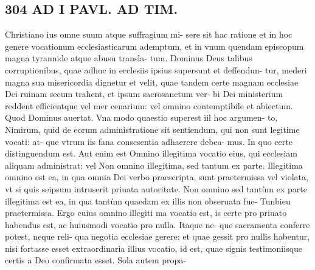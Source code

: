 \documentclass{article}
\begin{document}
\begin{pages}
\section*{304 AD I PAVL. AD TIM. }\pstart Christiano ius omne suum atque suffragium mi- sere sit hac ratione et in hoc genere vocationum ecclesiasticarum ademptum, et in vnum quendam episcopum magna tyrannide atque abusu transla- tum. Dominus Deus talibus corruptionibus, quae adhuc in ecclesiis ipsius supersunt et deffendun- tur, mederi magna sua misericordia dignetur et velit, quae tandem certe magnam ecclesiae Dei ruinam secum trahent, et ipsum sacrosanctum ver- bi Dei ministerium reddent efficientque vel mer cenarium: vel omnino contemptibile et abiectum. Quod Dominus auertat.  \pend\pstart Vna modo quaestio superest iil hoc argumen- to, Nimirum, quid de eorum administratione sit sentiendum, qui non sunt legitime vocati: at- que vtrum iis fana conscsentia adhaerere debea- mus. In quo certe distinguendum est. Aut enim est Omnino illegitima vocatio eius, qui ecclesiam aliquam administrat: vel Non omnino illegitima, sed tantum ex parte.  \pend\pstart Illegitima omnino est ea, in qua omnia Dei verbo praescripta, sunt praetermissa vel violata, vt si quis seipsum intruserit priuata autoritate. Non omnino sed tantùm ex parte illegitima est ea, in qua tantùm quaedam ex illis non obseruata fue- Tunbieu praetermissa. Ergo cuius omnino illegiti ma vocatio est, is certe pro priuato habendus est, ac huiusmodi vocatio pro nulla. Itaque ne- que sacramenta conferre potest, neque reli- qua negotia ecclesiae gerere: et quae gessit pro nullis habentur, nisi fortasse esset extraordinaria illius vocatio, id est, quae signis testimoniisque certis a Deo confirmata esset. Sola autem propa-  \pend

\end{pages}
\end{document}
